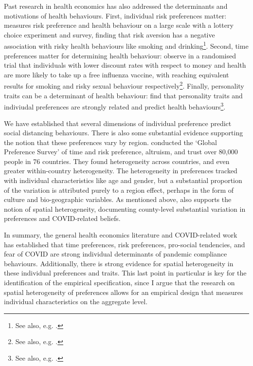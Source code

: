\documentclass[12pt,a4]{article}
\begin{document}
Past research in health economics has also addressed the determinants and motivations of health behaviours. First, individual risk preferences matter: \textcite{andersonPredictingHealthBehaviors2008} measures risk preference and health behaviour on a large scale with a lottery choice experiment and survey, finding that risk aversion has a negative association with risky health behaviours like smoking and drinking\footnote{See also, e.g. \textcite{dohmenIndividualRiskAttitudes2011}.}. Second, time preferences matter for determining health behaviour: \textcite{chapmanTimePreferencesPreventive1999} observe in a randomised trial that individuals with lower discount rates with respect to money and health are more likely to take up a free influenza vaccine, with \textcite{harrisonIndividualDiscountRates2010,chessonDiscountRatesRisky2006} reaching equivalent results for smoking and risky sexual behaviour respectively\footnote{See also, e.g.  \textcite{dellavignaPayingNotGo2006,sutterImpatienceUncertaintyExperimental2013,stutzerLimitedSelfcontrolObesity2016,schilbachAlcoholSelfControlField2019}.}. Finally, personality traits can be a determinant of health behaviour: \textcite{rustichiniIntegrationPersonalityTheory2016} find that personality traits and indiviudal preferences are strongly related and predict health behaviours\footnote{See also, e.g. \textcite{booth-kewleyAssociationsMajorDomains1994,strickhouserDoesPersonalityPredict2017}.}.

We have established that several dimensions of individual preference predict social distancing behaviours. There is also some substantial evidence supporting the notion that these preferences vary by region. \textcite{falkGlobalEvidenceEconomic2018} conducted the `Global Preference Survey' of time and risk preference, altruism, and trust over 80,000 people in 76 countries. They found heterogeneity across countries, and even greater within-country heterogeneity. The heterogeneity in preferences tracked with individual characteristics like age and gender, but a substantial proportion of the variation is attributed purely to a region effect, perhaps in the form of culture and bio-geographic variables. As mentioned above, \textcite{fanHeterogeneousActionsBeliefs2020} also supports the notion of spatial heterogeneity, documenting county-level substantial variation in preferences and COVID-related beliefs.

In summary, the general health economics literature and COVID-related work has established that time preferences, risk preferences, pro-social tendencies, and fear of COVID are strong individual determinants of pandemic compliance behaviours. Additionally, there is strong evidence for spatial heterogeneity in these individual preferences and traits. This last point in particular is key for the identification of the empirical specification, since I argue that the research on spatial heterogeneity of preferences allows for an empirical design that measures individual characteristics on the aggregate level. 
\end{document}
